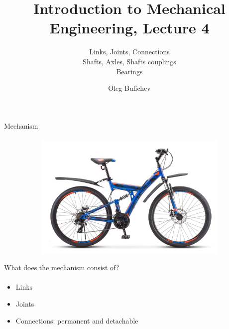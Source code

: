 \documentclass[aspectratio=169]{beamer}
\title[IME]{Introduction to Mechanical Engineering, Lecture 4} %
\subtitle{Links, Joints, Connections
\\ Shafts, Axles, Shafts couplings \\   
Bearings} %
\author{Oleg Bulichev}
\newcommand{\fbckg}[1]{\usebackgroundtemplate{\texttt{[image: \#1]}}}%
\begin{document}
\setlength{\abovedisplayskip}{0pt}
\setlength{\belowdisplayskip}{0pt}
\setlength{\abovedisplayshortskip}{0pt}
\setlength{\belowdisplayshortskip}{0pt}

\fbckg{fibeamer/figs/title_page.png}

\fbckg{fibeamer/figs/common.png}

\note{\scriptsize \begin{itemize}
        \item \ 
    \end{itemize}}

\begin{frame}[t]{Mechanism}
\framesubtitle{}
    \vspace{-0.6cm}
    \begin{figure}[H]
        \centering\includegraphics[height=6cm,width=1\textwidth,keepaspectratio]{bike.jpg}
        \label{fig:bike.jpg}
    \end{figure}
\end{frame}

\begin{frame}[t]{What does the mechanism consist of?}
\framesubtitle{}
    \begin{itemize}
        \item Links
        \item Joints
        \item Connections: permanent and detachable
    \end{itemize}
\end{frame}
\end{document}
